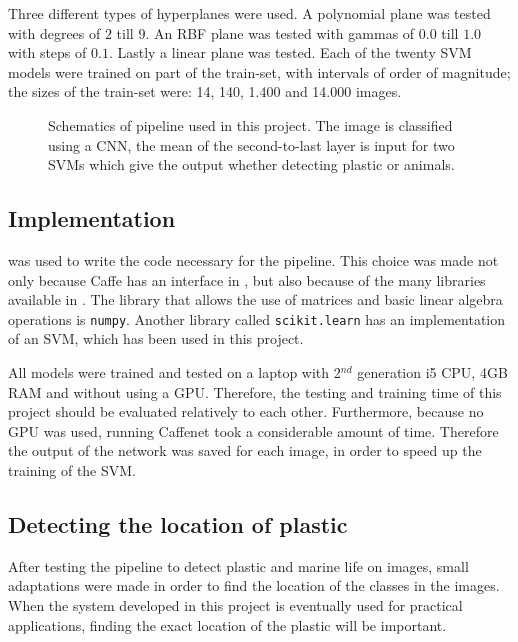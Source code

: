 Three different types of hyperplanes were used.
A polynomial plane was tested with degrees of $2$ till $9$.
An RBF plane was tested with gammas of $0.0$ till $1.0$ with steps of $0.1$.
Lastly a linear plane was tested.
Each of the twenty SVM models were trained on part of the train-set, with intervals of order of magnitude; the sizes of the train-set were: 14, 140, 1.400 and 14.000 images.

\begin{figure}
\centering
\ifx\showfig\undefined
 \fi
\caption{Schematics of pipeline used in this project. The image is classified using a CNN, the mean of the second-to-last layer is input for two SVMs which give the output whether detecting plastic or animals.}
\label{fig:pipeline}
\end{figure}


\subsection{Implementation}
\label{sec:Method-implementation}
{\Python} was used to write the code necessary for the pipeline.
This choice was made not only because Caffe has an interface in \Python, but also because of the many libraries available in \Python.
The library that allows the use of matrices and basic linear algebra operations is \texttt{numpy}.
Another library called \texttt{scikit.learn} has an implementation of an SVM, which has been used in this project.

All models were trained and tested on a laptop with 2$^{nd}$ generation i5 CPU, 4GB RAM and without using a GPU. Therefore, the testing and training time of this project should be evaluated relatively to each other.
Furthermore, because no GPU was used, running Caffenet took a considerable amount of time. Therefore the output of the network was saved for each image, in order to speed up the training of the SVM.

\subsection{Detecting the location of plastic}
\label{sec:Method-location}
After testing the pipeline to detect plastic and marine life on images, small adaptations were made in order to find the location of the classes in the images.
When the system developed in this project is eventually used for practical applications, finding the exact location of the plastic will be important.

